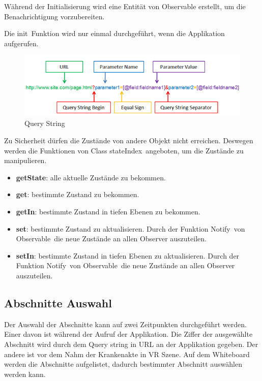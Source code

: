   Während der Initialisierung wird eine Entität von Observable erstellt, um die Benachrichtigung vorzubereiten.
  
  Die \glqq init\grqq\ Funktion wird nur einmal durchgeführt, wenn die Applikation aufgerufen.
  
\begin{figure}[ht]
\centering
\includegraphics[width=\textwidth]{images/queryString.png}
\caption[Query String]{Query String}
\label{fig:queryString} 
\end{figure}
  
  Zu Sicherheit dürfen die Zustände von andere Objekt nicht erreichen. Deswegen werden die Funktionen von Class \glqq stateIndex\grqq\ angeboten, um die Zustände zu manipulieren.
  
  \begin{itemize}
      \item \textbf{getState}: alle aktuelle Zustände zu bekommen.
      \item \textbf{get}: bestimmte Zustand zu bekommen.
      \item \textbf{getIn}: bestimmte Zustand in tiefen Ebenen zu bekommen.
      \item \textbf{set}: bestimmte Zustand zu aktualisieren. Durch der Funktion \glqq Notify\grqq\ von \glqq Observable\grqq\ die neue Zustände an allen Observer auszuteilen.
      \item \textbf{setIn}: bestimmte Zustand in tiefen Ebenen zu aktualisieren. Durch der Funktion \glqq Notify\grqq\ von \glqq Observable\grqq\ die neue Zustände an allen Observer auszuteilen.
  \end{itemize}
  
 \subsection{Abschnitte Auswahl}
 Der Auswahl der Abschnitte kann auf zwei Zeitpunkten durchgeführt werden. Einer davon ist während der Aufruf der Applikation. Die Ziffer der ausgewählte Abschnitt wird durch dem Query string in URL an der Applikation gegeben. Der andere ist vor dem Nahm der Krankenakte in VR Szene. Auf dem Whiteboard werden die Abschnitte aufgelistet, dadurch bestimmter Abschnitt auswählen werden kann.
 
